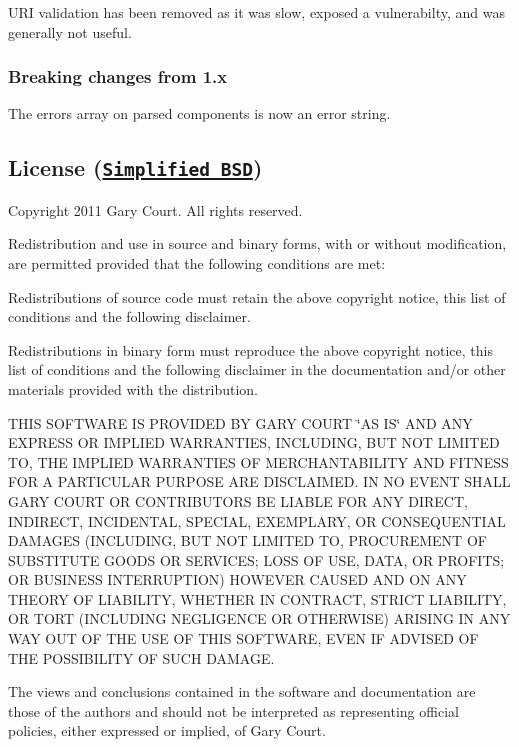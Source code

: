 U\+RI validation has been removed as it was slow, exposed a vulnerabilty, and was generally not useful.

\subsubsection*{Breaking changes from 1.\+x}

The {\ttfamily errors} array on parsed components is now an {\ttfamily error} string.

\subsection*{License (\href{http://en.wikipedia.org/wiki/BSD_licenses#2-clause}{\tt Simplified B\+SD})}

Copyright 2011 Gary Court. All rights reserved.

Redistribution and use in source and binary forms, with or without modification, are permitted provided that the following conditions are met\+:


\begin{DoxyEnumerate}
\item Redistributions of source code must retain the above copyright notice, this list of conditions and the following disclaimer.
\item Redistributions in binary form must reproduce the above copyright notice, this list of conditions and the following disclaimer in the documentation and/or other materials provided with the distribution.
\end{DoxyEnumerate}

T\+H\+IS S\+O\+F\+T\+W\+A\+RE IS P\+R\+O\+V\+I\+D\+ED BY G\+A\+RY C\+O\+U\+RT \char`\"{}\+A\+S I\+S\char`\"{} A\+ND A\+NY E\+X\+P\+R\+E\+SS OR I\+M\+P\+L\+I\+ED W\+A\+R\+R\+A\+N\+T\+I\+ES, I\+N\+C\+L\+U\+D\+I\+NG, B\+UT N\+OT L\+I\+M\+I\+T\+ED TO, T\+HE I\+M\+P\+L\+I\+ED W\+A\+R\+R\+A\+N\+T\+I\+ES OF M\+E\+R\+C\+H\+A\+N\+T\+A\+B\+I\+L\+I\+TY A\+ND F\+I\+T\+N\+E\+SS F\+OR A P\+A\+R\+T\+I\+C\+U\+L\+AR P\+U\+R\+P\+O\+SE A\+RE D\+I\+S\+C\+L\+A\+I\+M\+ED. IN NO E\+V\+E\+NT S\+H\+A\+LL G\+A\+RY C\+O\+U\+RT OR C\+O\+N\+T\+R\+I\+B\+U\+T\+O\+RS BE L\+I\+A\+B\+LE F\+OR A\+NY D\+I\+R\+E\+CT, I\+N\+D\+I\+R\+E\+CT, I\+N\+C\+I\+D\+E\+N\+T\+AL, S\+P\+E\+C\+I\+AL, E\+X\+E\+M\+P\+L\+A\+RY, OR C\+O\+N\+S\+E\+Q\+U\+E\+N\+T\+I\+AL D\+A\+M\+A\+G\+ES (I\+N\+C\+L\+U\+D\+I\+NG, B\+UT N\+OT L\+I\+M\+I\+T\+ED TO, P\+R\+O\+C\+U\+R\+E\+M\+E\+NT OF S\+U\+B\+S\+T\+I\+T\+U\+TE G\+O\+O\+DS OR S\+E\+R\+V\+I\+C\+ES; L\+O\+SS OF U\+SE, D\+A\+TA, OR P\+R\+O\+F\+I\+TS; OR B\+U\+S\+I\+N\+E\+SS I\+N\+T\+E\+R\+R\+U\+P\+T\+I\+ON) H\+O\+W\+E\+V\+ER C\+A\+U\+S\+ED A\+ND ON A\+NY T\+H\+E\+O\+RY OF L\+I\+A\+B\+I\+L\+I\+TY, W\+H\+E\+T\+H\+ER IN C\+O\+N\+T\+R\+A\+CT, S\+T\+R\+I\+CT L\+I\+A\+B\+I\+L\+I\+TY, OR T\+O\+RT (I\+N\+C\+L\+U\+D\+I\+NG N\+E\+G\+L\+I\+G\+E\+N\+CE OR O\+T\+H\+E\+R\+W\+I\+SE) A\+R\+I\+S\+I\+NG IN A\+NY W\+AY O\+UT OF T\+HE U\+SE OF T\+H\+IS S\+O\+F\+T\+W\+A\+RE, E\+V\+EN IF A\+D\+V\+I\+S\+ED OF T\+HE P\+O\+S\+S\+I\+B\+I\+L\+I\+TY OF S\+U\+CH D\+A\+M\+A\+GE.

The views and conclusions contained in the software and documentation are those of the authors and should not be interpreted as representing official policies, either expressed or implied, of Gary Court. 